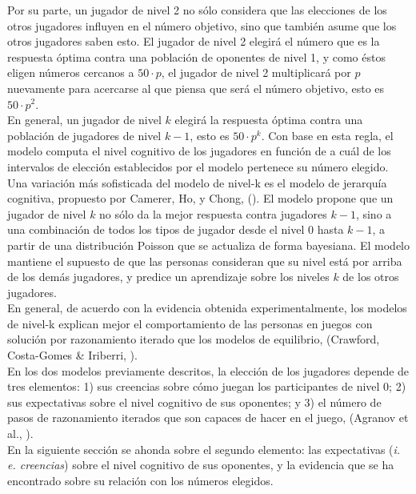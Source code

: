 Por su parte, un jugador de nivel 2 no sólo considera que las elecciones de los otros jugadores influyen en el número objetivo, sino que también asume que los otros jugadores saben esto. El jugador de nivel 2 elegirá el número que es la respuesta óptima contra una población de oponentes de nivel 1, y como éstos eligen números cercanos a $50 \cdot p$, el jugador de nivel 2 multiplicará por $p$ nuevamente para acercarse al que piensa que será el número objetivo, esto es $50 \cdot p^2$.\\

En general, un jugador de nivel $k$ elegirá la respuesta óptima contra una población de jugadores de nivel $k-1$, esto es $50 \cdot p^k$.  Con base en esta regla, el modelo computa el nivel cognitivo de los jugadores en función de a cuál de los intervalos de elección establecidos por el modelo pertenece su número elegido.\\

Una variación más sofisticada del modelo de nivel-k es el modelo de jerarquía cognitiva, propuesto por Camerer, Ho, y Chong, (\citeyear{Camerer}). El modelo propone que un jugador de nivel $k$ no sólo da la mejor respuesta contra jugadores $k-1$, sino a una combinación de todos los tipos de jugador desde el nivel 0 hasta $k-1$, a partir de una distribución Poisson que se actualiza de forma bayesiana. El modelo mantiene el supuesto de que las personas consideran que su nivel está por arriba de los demás jugadores, y predice un aprendizaje sobre los niveles $k$ de los otros jugadores.\\

En general, de acuerdo con la evidencia obtenida experimentalmente, los modelos de nivel-k explican mejor el comportamiento de las personas en juegos con solución por razonamiento iterado que los modelos de equilibrio, (Crawford, Costa-Gomes & Iriberri, \citeyear{Crawford}).\\

En los dos modelos previamente descritos, la elección de los jugadores depende de tres elementos: 1) sus creencias sobre cómo juegan los participantes de nivel 0; 2) sus expectativas sobre el nivel cognitivo de sus oponentes; y 3) el número de pasos de razonamiento iterados que son capaces de hacer en el juego, (Agranov et al., \citeyear{Agranov}).\\

En la siguiente sección se ahonda sobre el segundo elemento: las expectativas (\textit{i. e. creencias}) sobre el nivel cognitivo de sus oponentes, y la evidencia que se ha encontrado sobre su relación con los números elegidos.

